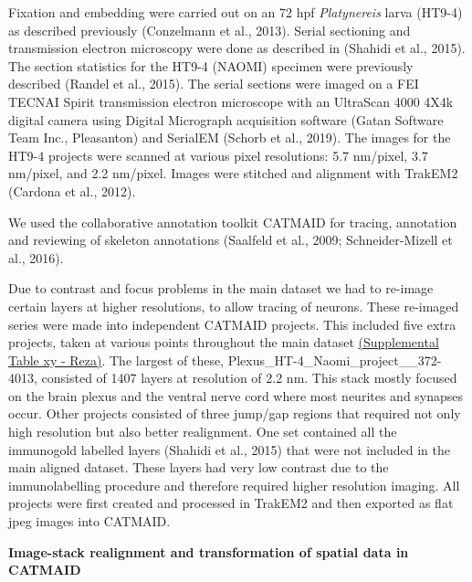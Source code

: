 \documentclass[
  11pt,
]{article}
\begin{document}
Fixation and embedding were carried out on an 72 hpf \emph{Platynereis}
larva (HT9-4) as described previously (Conzelmann et al., 2013). Serial
sectioning and transmission electron microscopy were done as described
in (Shahidi et al., 2015). The section statistics for the HT9-4 (NAOMI)
specimen were previously described (Randel et al., 2015). The serial
sections were imaged on a FEI TECNAI Spirit transmission electron
microscope with an UltraScan 4000 4X4k digital camera using Digital
Micrograph acquisition software (Gatan Software Team Inc., Pleasanton)
and SerialEM (Schorb et al., 2019). The images for the HT9-4 projects
were scanned at various pixel resolutions: 5.7 nm/pixel, 3.7 nm/pixel,
and 2.2 nm/pixel. Images were stitched and alignment with TrakEM2
(Cardona et al., 2012).

We used the collaborative annotation toolkit CATMAID for tracing,
annotation and reviewing of skeleton annotations (Saalfeld et al., 2009;
Schneider-Mizell et al., 2016).

Due to contrast and focus problems in the main dataset we had to
re-image certain layers at higher resolutions, to allow tracing of
neurons. These re-imaged series were made into independent CATMAID
projects. This included five extra projects, taken at various points
throughout the main dataset \href{check}{(Supplemental Table xy -
Reza)}. The largest of these, Plexus\_HT-4\_Naomi\_project\_\_372-4013,
consisted of 1407 layers at resolution of 2.2 nm. This stack mostly
focused on the brain plexus and the ventral nerve cord where most
neurites and synapses occur. Other projects consisted of three jump/gap
regions that required not only high resolution but also better
realignment. One set contained all the immunogold labelled layers
(Shahidi et al., 2015) that were not included in the main aligned
dataset. These layers had very low contrast due to the immunolabelling
procedure and therefore required higher resolution imaging. All projects
were first created and processed in TrakEM2 and then exported as flat
jpeg images into CATMAID.

\textbf{Image-stack realignment and transformation of spatial data in
CATMAID}
\end{document}
